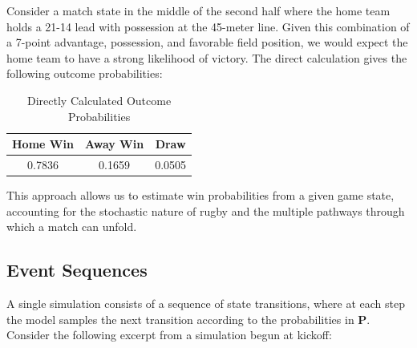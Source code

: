\documentclass[12pt]{article}
\begin{document}
Consider a match state in the middle of the second half where the home team holds a 21-14 lead with possession at the 45-meter line. Given this combination of a 7-point advantage, possession, and favorable field position, we would expect the home team to have a strong likelihood of victory. The direct calculation gives the following outcome probabilities:

\begin{table}[h]
\centering
\caption{Directly Calculated Outcome Probabilities}
\begin{tabular}{ccc}
\hline
\textbf{Home Win} & \textbf{Away Win} & \textbf{Draw} \\
\hline
0.7836 & 0.1659 & 0.0505 \\
\hline
\end{tabular}
\label{tab:sim_results}
\end{table}

This approach allows us to estimate win probabilities from a given game state, accounting for the stochastic nature of rugby and the multiple pathways through which a match can unfold.

\subsection{Event Sequences}

A single simulation consists of a sequence of state transitions, where at each step the model samples the next transition according to the probabilities in $\mathbf{P}$. Consider the following excerpt from a simulation begun at kickoff:

\begin{table}[h]
\centering
\caption{Example Play-by-Play Sequence from a Single Simulation. Possession and scores are shown after each transition; points are signed relative to the team in possession before the transition.}
\label{tab:pbp_example}
\end{table}
\end{document}
